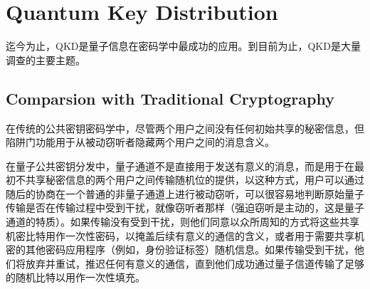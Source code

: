 \chapter{Quantum Key Distribution}
\label{chap:Quantum Key Distribution}

迄今为止，QKD是量子信息在密码学中最成功的应用。到目前为止，QKD是大量调查的主要主题。

\section{Comparsion with Traditional Cryptography}
在传统的公共密钥密码学中，尽管两个用户之间没有任何初始共享的秘密信息，但陷阱门功能用于从被动窃听者隐藏两个用户之间的消息含义。

在量子公共密钥分发中，量子通道不是直接用于发送有意义的消息，而是用于在最初不共享秘密信息的两个用户之间传输随机位的提供，以这种方式，用户可以通过随后的协商在一个普通的非量子通道上进行被动窃听，可以很容易地判断原始量子传输是否在传输过程中受到干扰，就像窃听者那样（强迫窃听是主动的，这是量子通道的特质）。如果传输没有受到干扰，则他们同意以众所周知的方式将这些共享机密比特用作一次性密码，以掩盖后续有意义的通信的含义，或者用于需要共享机密的其他密码应用程序（例如，身份验证标签）随机信息。如果传输受到干扰，他们将放弃并重试，推迟任何有意义的通信，直到他们成功通过量子信道传输了足够的随机比特以用作一次性填充。

